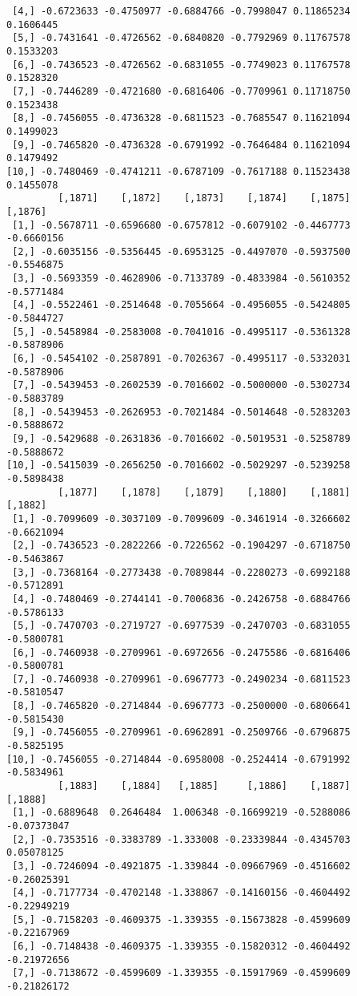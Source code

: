 \documentclass[
  letterpaper,
  DIV=11,
  numbers=noendperiod]{scrreprt}
\begin{document}
\begin{verbatim}
 [4,] -0.6723633 -0.4750977 -0.6884766 -0.7998047 0.11865234  0.1606445
 [5,] -0.7431641 -0.4726562 -0.6840820 -0.7792969 0.11767578  0.1533203
 [6,] -0.7436523 -0.4726562 -0.6831055 -0.7749023 0.11767578  0.1528320
 [7,] -0.7446289 -0.4721680 -0.6816406 -0.7709961 0.11718750  0.1523438
 [8,] -0.7456055 -0.4736328 -0.6811523 -0.7685547 0.11621094  0.1499023
 [9,] -0.7465820 -0.4736328 -0.6791992 -0.7646484 0.11621094  0.1479492
[10,] -0.7480469 -0.4741211 -0.6787109 -0.7617188 0.11523438  0.1455078
         [,1871]    [,1872]    [,1873]    [,1874]    [,1875]    [,1876]
 [1,] -0.5678711 -0.6596680 -0.6757812 -0.6079102 -0.4467773 -0.6660156
 [2,] -0.6035156 -0.5356445 -0.6953125 -0.4497070 -0.5937500 -0.5546875
 [3,] -0.5693359 -0.4628906 -0.7133789 -0.4833984 -0.5610352 -0.5771484
 [4,] -0.5522461 -0.2514648 -0.7055664 -0.4956055 -0.5424805 -0.5844727
 [5,] -0.5458984 -0.2583008 -0.7041016 -0.4995117 -0.5361328 -0.5878906
 [6,] -0.5454102 -0.2587891 -0.7026367 -0.4995117 -0.5332031 -0.5878906
 [7,] -0.5439453 -0.2602539 -0.7016602 -0.5000000 -0.5302734 -0.5883789
 [8,] -0.5439453 -0.2626953 -0.7021484 -0.5014648 -0.5283203 -0.5888672
 [9,] -0.5429688 -0.2631836 -0.7016602 -0.5019531 -0.5258789 -0.5888672
[10,] -0.5415039 -0.2656250 -0.7016602 -0.5029297 -0.5239258 -0.5898438
         [,1877]    [,1878]    [,1879]    [,1880]    [,1881]    [,1882]
 [1,] -0.7099609 -0.3037109 -0.7099609 -0.3461914 -0.3266602 -0.6621094
 [2,] -0.7436523 -0.2822266 -0.7226562 -0.1904297 -0.6718750 -0.5463867
 [3,] -0.7368164 -0.2773438 -0.7089844 -0.2280273 -0.6992188 -0.5712891
 [4,] -0.7480469 -0.2744141 -0.7006836 -0.2426758 -0.6884766 -0.5786133
 [5,] -0.7470703 -0.2719727 -0.6977539 -0.2470703 -0.6831055 -0.5800781
 [6,] -0.7460938 -0.2709961 -0.6972656 -0.2475586 -0.6816406 -0.5800781
 [7,] -0.7460938 -0.2709961 -0.6967773 -0.2490234 -0.6811523 -0.5810547
 [8,] -0.7465820 -0.2714844 -0.6967773 -0.2500000 -0.6806641 -0.5815430
 [9,] -0.7456055 -0.2709961 -0.6962891 -0.2509766 -0.6796875 -0.5825195
[10,] -0.7456055 -0.2714844 -0.6958008 -0.2524414 -0.6791992 -0.5834961
         [,1883]    [,1884]   [,1885]     [,1886]    [,1887]     [,1888]
 [1,] -0.6889648  0.2646484  1.006348 -0.16699219 -0.5288086 -0.07373047
 [2,] -0.7353516 -0.3383789 -1.333008 -0.23339844 -0.4345703  0.05078125
 [3,] -0.7246094 -0.4921875 -1.339844 -0.09667969 -0.4516602 -0.26025391
 [4,] -0.7177734 -0.4702148 -1.338867 -0.14160156 -0.4604492 -0.22949219
 [5,] -0.7158203 -0.4609375 -1.339355 -0.15673828 -0.4599609 -0.22167969
 [6,] -0.7148438 -0.4609375 -1.339355 -0.15820312 -0.4604492 -0.21972656
 [7,] -0.7138672 -0.4599609 -1.339355 -0.15917969 -0.4599609 -0.21826172

\end{verbatim}
\end{document}
